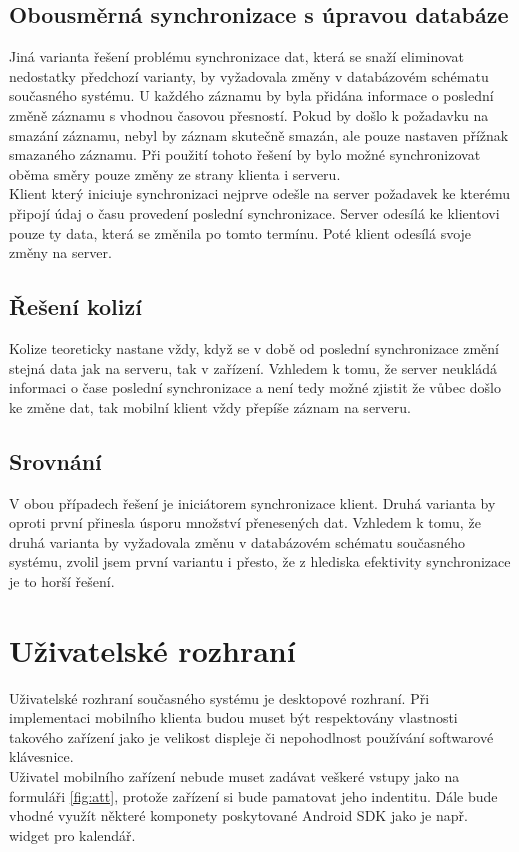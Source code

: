 \documentclass{diplomka}
\begin{document}
\subsection{Obousměrná synchronizace s úpravou databáze}
Jiná varianta řešení problému synchronizace dat, která se snaží eliminovat nedostatky předchozí varianty, by vyžadovala změny v databázovém schématu současného systému. U každého záznamu by byla přidána informace o poslední změně záznamu s vhodnou časovou přesností. Pokud by došlo k požadavku na smazání záznamu, nebyl by záznam skutečně smazán, ale pouze nastaven přížnak smazaného záznamu. Při použití tohoto řešení by bylo možné synchronizovat oběma směry pouze změny ze strany klienta i serveru. \\ \indent
Klient který iniciuje synchronizaci nejprve odešle na server požadavek ke kterému připojí údaj o času provedení poslední synchronizace. Server odesílá ke klientovi pouze ty data, která se změnila po tomto termínu. Poté klient odesílá svoje změny na server.

\subsection{Řešení kolizí}
Kolize teoreticky nastane vždy, když se v době od poslední synchronizace změní stejná data jak na serveru, tak v zařízení. Vzhledem k tomu, že server neukládá informaci o čase poslední synchronizace a není tedy možné zjistit že vůbec došlo ke změne dat, tak mobilní klient vždy přepíše záznam na serveru.

\subsection{Srovnání}
V obou případech řešení je iniciátorem synchronizace klient. Druhá varianta by oproti první přinesla úsporu množství přenesených dat. Vzhledem k tomu, že druhá varianta by vyžadovala změnu v databázovém schématu současného systému, zvolil jsem první variantu i přesto, že z hlediska efektivity synchronizace je to horší řešení.

\section{Uživatelské rozhraní}
Uživatelské rozhraní současného systému je desktopové rozhraní. Při implementaci mobilního klienta budou muset být respektovány vlastnosti takového zařízení jako je velikost displeje či nepohodlnost používání softwarové klávesnice.\\
\indent Uživatel mobilního zařízení nebude muset zadávat veškeré vstupy jako na formuláři \ref{fig:att}, protože zařízení si bude pamatovat jeho indentitu. Dále bude vhodné využít některé komponety poskytované Android SDK jako je např. widget pro kalendář.
\end{document}
